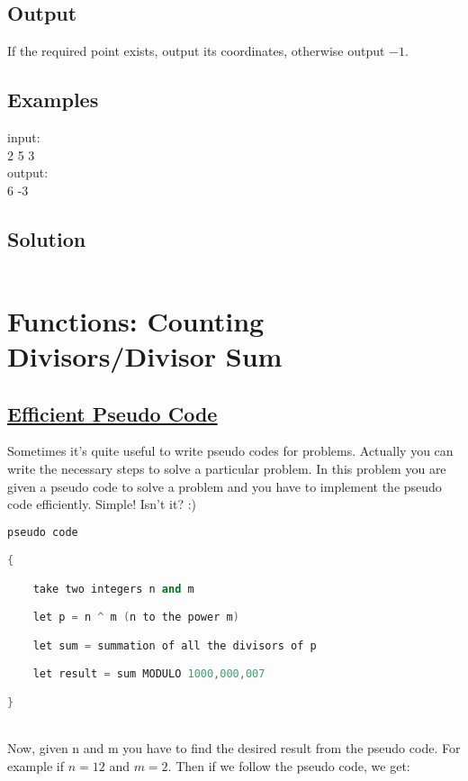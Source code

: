 \documentclass[10pt,a4paper]{article}
\begin{document}
\subsection*{Output}
If the required point exists, output its coordinates, otherwise output $-1$.

\subsection*{Examples}
input: \\
2 5 3 \\
output: \\
6 -3 
\subsection*{Solution}

\begin{lstlisting}[language=C++, caption={Line},label={1st:code}, mathescape=true, breaklines=true]

\end{lstlisting}


\section{Functions: Counting Divisors/Divisor Sum}

\subsection*{\hyperlink{https://lightoj.com/problem/efficient-pseudo-code}{\underline{Efficient Pseudo Code}}}

Sometimes it's quite useful to write pseudo codes for problems. Actually you can write the necessary steps to solve a particular problem. In this problem you are given a pseudo code to solve a problem and you have to implement the pseudo code efficiently. Simple! Isn't it? :)
\\

\begin{lstlisting}[language=C++, label={1st:code}, mathescape=true, breaklines=true]
pseudo code

{

    take two integers n and m

    let p = n ^ m (n to the power m)

    let sum = summation of all the divisors of p

    let result = sum MODULO 1000,000,007

}
\end{lstlisting}
\\
Now, given n and m you have to find the desired result from the pseudo code. For example if $n = 12$ and $m = 2$. Then if we follow the pseudo code, we get:
\end{document}
